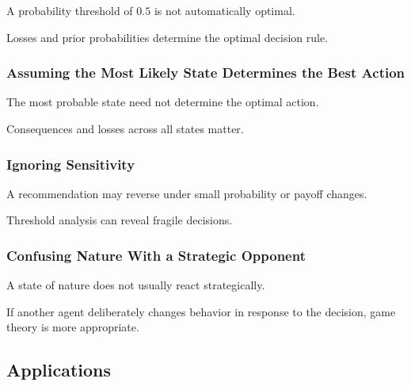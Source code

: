 A probability threshold of \(0.5\) is not automatically optimal.

Losses and prior probabilities determine the optimal decision rule.

\subsubsection{Assuming the Most Likely State Determines the Best Action}

The most probable state need not determine the optimal action.

Consequences and losses across all states matter.

\subsubsection{Ignoring Sensitivity}

A recommendation may reverse under small probability or payoff changes.

Threshold analysis can reveal fragile decisions.

\subsubsection{Confusing Nature With a Strategic Opponent}

A state of nature does not usually react strategically.

If another agent deliberately changes behavior in response to the
decision, game theory is more appropriate.

\subsection{Applications}
\label{subsec:decision-theory-applications}

